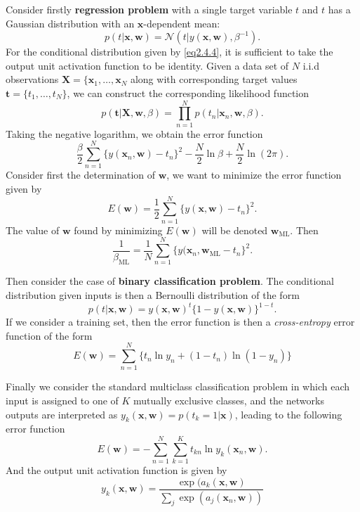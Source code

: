 \documentclass[a4paper]{book}
\newcommand{\normD}{\mathcal{N}}
\newcommand{\mrm}{\mathrm}
\newcommand{\mbf}{\mathbf}
\newcommand{\XX}{\mbf X}
\newcommand{\ww}{\mbf w}
\newcommand{\ttt}{\mbf t}
\newcommand{\xx}{\mbf x}
\newcommand{\rev}{^{-1}}
\begin{document}
Consider firstly \textbf{regression problem} with a single target variable $t$ and $t$ has a Gaussian distribution with an $\xx$-dependent mean:
\begin{equation}\label{eq2.4.4}
p(t|\xx,\ww)=\normD(t|y(\xx,\ww), \beta\rev).
\end{equation}
For the conditional distribution given by \ref{eq2.4.4}, it is sufficient to take the output unit activation function to be identity. Given a data set of $N$  i.i.d observations $\XX =\{\xx_1,\dots,\xx_N$ along with corresponding target values $\ttt = \{t_1,\dots,t_N\}$, we can construct the corresponding likelihood function
\begin{equation}\label{}
  p(\ttt|\XX,\ww,\beta)=\prod_{n=1}^{N}p(t_n|\xx_n,\ww,\beta).
\end{equation}
Taking the negative logarithm, we obtain the error function
\begin{equation}\label{}
  \frac{\beta}{2}\sum_{n=1}^{N}\{y(\xx_n,\ww)-t_n\}^2-\frac{N}{2}\ln \beta+\frac N2\ln(2\pi).
\end{equation}
Consider first the determination of $\ww$, we want to minimize the error function given by
\begin{equation}\label{}
  E(\ww)=\frac12\sum_{n=1}^{N}\{y(\xx,\ww)-t_n\}^2.
\end{equation}
The value of $\ww$ found by minimizing $E(\ww)$ will be denoted $\ww_{\mrm{ML}}$. Then
\begin{equation}\label{}
  \frac{1}{\beta_{\mrm{ML}}}=\frac1N\sum_{n=1}^{N}\{y(\xx_n,\ww_{\mrm{ML}}-t_n\}^2.
\end{equation}

Then consider the case of \textbf{binary classification problem}. The conditional distribution given inputs is then a Bernoulli distribution of the form
\begin{equation}\label{}
  p(t|\xx,\ww) = y(\xx,\ww)^t\{1-y(\xx,\ww)\}^{1-t}.
\end{equation}
If we consider a training set, then the error function is then a \textit{cross-entropy} error function  of the form
\begin{equation}\label{}
  E(\ww) = \sum_{n=1}^{N}\{t_n\ln y_n+(1-t_n)\ln (1-y_n)\}
\end{equation}

Finally we consider the standard multiclass classification problem in which each input is assigned to one of $K$ mutually exclusive classes, and the networks outputs are interpreted as $y_k(\xx,\ww) = p(t_k=1|\xx)$, leading to the following error function
\begin{equation}\label{}
  E(\ww) = -\sum_{n=1}^{N}\sum_{k=1}^{K}t_{kn}\ln y_k(\xx_n,\ww).
\end{equation}
And the output unit activation function is given by
\begin{equation}\label{}
  y_k(\xx,\ww) = \frac{\exp(a_k(\xx,\ww)}{\sum_j\exp(a_j(\xx_n,\ww))}
\end{equation}
\end{document}
